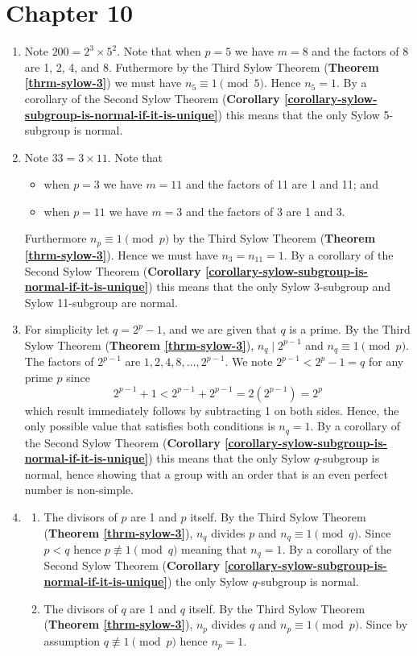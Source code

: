 \section*{Chapter 10}
\begin{enumerate}
    \item Note $200 = 2^3 \times 5^2$. Note that when $p = 5$ we have $m = 8$ and the factors of 8 are 1, 2, 4, and 8. Futhermore by the Third Sylow Theorem (\textbf{Theorem \ref{thrm-sylow-3}}) we must have $n_5 \equiv 1 \pmod 5$. Hence $n_5 = 1$. By a corollary of the Second Sylow Theorem (\textbf{Corollary \ref{corollary-sylow-subgroup-is-normal-if-it-is-unique}}) this means that the only Sylow 5-subgroup is normal.

    \item Note $33 = 3 \times 11$. Note that
    \begin{itemize}
        \item when $p = 3$ we have $m = 11$ and the factors of 11 are 1 and 11; and
        \item when $p = 11$ we have $m = 3$ and the factors of 3 are 1 and 3.
    \end{itemize}
    Furthermore $n_p \equiv 1 \pmod p$ by the Third Sylow Theorem (\textbf{Theorem \ref{thrm-sylow-3}}). Hence we must have $n_3 = n_{11} = 1$. By a corollary of the Second Sylow Theorem (\textbf{Corollary \ref{corollary-sylow-subgroup-is-normal-if-it-is-unique}}) this means that the only Sylow 3-subgroup and Sylow 11-subgroup are normal.

    \item For simplicity let $q = 2^p - 1$, and we are given that $q$ is a prime. By the Third Sylow Theorem (\textbf{Theorem \ref{thrm-sylow-3}}), $n_q \mid 2^{p-1}$ and $n_q \equiv 1 \pmod p$. The factors of $2^{p-1}$ are $1, 2, 4, 8, \dots, 2^{p-1}$. We note $2^{p-1} < 2^p - 1 = q$ for any prime $p$ since
    \[
        2^{p-1} + 1 < 2^{p-1} + 2^{p-1} = 2(2^{p-1}) = 2^p    
    \]
    which result immediately follows by subtracting 1 on both sides. Hence, the only possible value that satisfies both conditions is $n_q = 1$. By a corollary of the Second Sylow Theorem (\textbf{Corollary \ref{corollary-sylow-subgroup-is-normal-if-it-is-unique}}) this means that the only Sylow $q$-subgroup is normal, hence showing that a group with an order that is an even perfect number is non-simple.

    \item \begin{enumerate}[label=(\roman*)]
        \item The divisors of $p$ are 1 and $p$ itself. By the Third Sylow Theorem (\textbf{Theorem \ref{thrm-sylow-3}}), $n_q$ divides $p$ and $n_q \equiv 1 \pmod q$. Since $p < q$ hence $p \not\equiv 1 \pmod q$ meaning that $n_q = 1$. By a corollary of the Second Sylow Theorem (\textbf{Corollary \ref{corollary-sylow-subgroup-is-normal-if-it-is-unique}}) the only Sylow $q$-subgroup is normal.
        \item The divisors of $q$ are 1 and $q$ itself. By the Third Sylow Theorem (\textbf{Theorem \ref{thrm-sylow-3}}), $n_p$ divides $q$ and $n_p \equiv 1 \pmod p$. Since by assumption $q \not\equiv 1 \pmod p$ hence $n_p = 1$.
        

\end{enumerate}
\end{enumerate}
